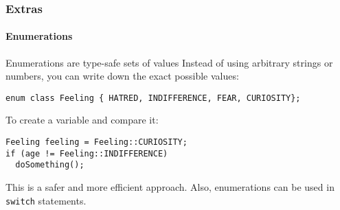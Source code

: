 \begin{frame}[fragile]
\frametitle{Extras}
\framesubtitle{Enumerations}

\begin{block}{Enumerations are type-safe sets of values}
Instead of using arbitrary strings or numbers, you can write down the exact possible values:

{\scriptsize 
\begin{verbatim}
enum class Feeling { HATRED, INDIFFERENCE, FEAR, CURIOSITY};
\end{verbatim}
}
\end{block}
\pause
\begin{block}{To create a variable and compare it:}

{\scriptsize 
\begin{verbatim}
Feeling feeling = Feeling::CURIOSITY;
if (age != Feeling::INDIFFERENCE)
  doSomething();
\end{verbatim}
}

This is a safer and more efficient approach. Also, enumerations can be used in \texttt{switch} statements.
\end{block}

\end{frame}

